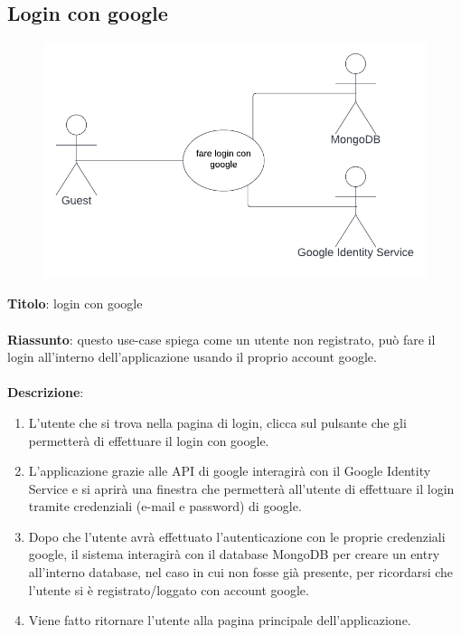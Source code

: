 \subsection{Login con google} \label{req_login_con_google}
\begin{figure}[!h]
\centering
\includegraphics[scale=0.35]{images/use_case_login_con_google.png}
\end{figure}
\noindent
\textbf{Titolo}: login con google \\
\\
\textbf{Riassunto}: questo use-case spiega come un utente non registrato, può fare il login all'interno dell'applicazione usando il proprio account google. \\
\\
\textbf{Descrizione}:
\begin{enumerate}
    \item L'utente che si trova nella pagina di login, clicca sul pulsante che gli permetterà di effettuare il login con google.
    \item L'applicazione grazie alle API di google interagirà con il Google Identity Service e si aprirà una finestra che permetterà all'utente di effettuare il login tramite credenziali (e-mail e password) di google. 
    \item Dopo che l'utente avrà effettuato l'autenticazione con le proprie credenziali google, il sistema interagirà con il database MongoDB per creare un entry all'interno database, nel caso in cui non fosse già presente, per ricordarsi che l'utente si è registrato/loggato con account google.
    \item Viene fatto ritornare l'utente alla pagina principale dell'applicazione.
\end{enumerate}

